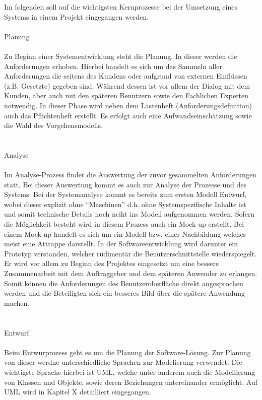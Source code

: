 Im folgenden soll auf die wichtigsten Kernprozesse bei der Umsetzung eines Systems in einem Projekt eingegangen werden.\\
\\
Planung\\
\\
Zu Beginn einer Systementwicklung steht die Planung. In dieser werden die Anforderungen erhoben. Hierbei handelt es sich um das Sammeln aller Anforderungen die seitens des Kundens oder aufgrund von externen Einflüssen (z.B. Gesetzte) gegeben sind. Während dessen ist vor allem der Dialog mit dem Kunden, aber auch mit den späteren Benutzern sowie den Fachlichen Experten notwendig. In dieser Phase wird neben dem Lastenheft (Anforderungsdefinition) auch das Pflichtenheft erstellt. Es erfolgt auch eine Aufwandseinschätzung sowie die Wahl des Vorgehensmodells.\\
\\
\\
Analyse\\
\\
Im Analyse-Prozess findet die Auswertung der zuvor gesammelten Anforderungen statt. Bei dieser Auswertung kommt es auch zur Analyse der Prozesse und des Systems. Bei der Systemanalyse kommt es bereits zum ersten Modell Entwurf, wobei dieser explizit ohne “Maschinen” d.h. ohne Systemspezifische Inhalte ist und somit technische Details noch nciht ins Modell aufgenommen werden. Sofern die Möglichkeit besteht wird in diesem Prozess auch ein Mock-up erstellt. Bei einem Mock-up handelt es sich um ein Modell bzw. einer Nachbildung welches meist eine Attrappe darstellt. In der Softwareentwicklung wird darunter ein Prototyp verstanden, welcher rudimentär die Benutzerschnittstelle wiederspiegelt. Er wird vor allem zu Beginn des Projektes eingesetzt um eine bessere Zusammenarbeit mit dem Auftraggeber und dem späteren Anwender zu erlangen. Somit können die Anforderungen des Benutzeroberfläche direkt angesprochen werden und die Beteiligten sich ein besseres Bild über die spätere Anwendung machen.\\
\\
\\
Entwurf\\
\\
Beim Entwurprozess geht es um die Planung der Software-Lösung. Zur Planung von dieser werdne unterschiedliche Sprachen zur Modelierung verwendet. Die wichtigste Sprache hierbei ist UML, welche unter anderem auch die Modellierung von Klassen und Objekte, sowie deren Beziehungen untereinander ermöglicht. Auf UML wird in Kapitel X detailliert eingegangen.

